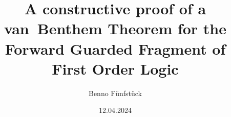 \date{12.04.2024}
\author{Benno Fünfstück}
\title{A constructive proof of a van~Benthem Theorem for the Forward Guarded Fragment of First Order Logic}
